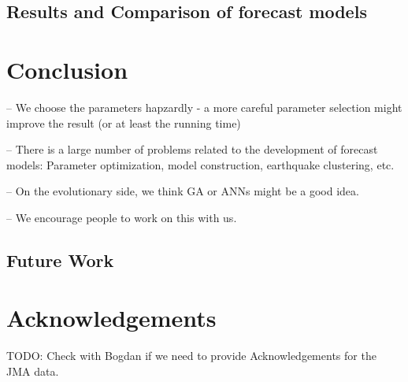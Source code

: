 \documentclass{sig-alternate}
\begin{document}
\subsection{Results and Comparison of forecast models}






\section{Conclusion}


-- We choose the parameters hapzardly - a more careful parameter
selection might improve the result (or at least the running time)


-- There is a large number of problems related to the development of
forecast models: Parameter optimization, model construction,
earthquake clustering, etc.

-- On the evolutionary side, we think GA or ANNs might be a good idea.

-- We encourage people to work on this with us.

\subsection{Future Work}




\section*{Acknowledgements}

TODO: Check with Bogdan if we need to provide Acknowledgements for the
JMA data.




\end{document}
